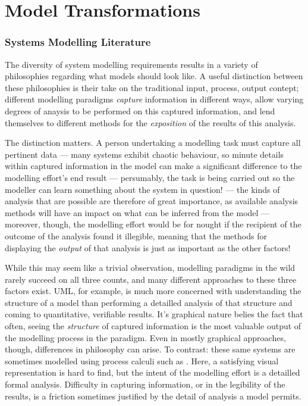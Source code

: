 \documentclass[draft]{article}
\begin{document}




\part{Model Transformations}
\section{Systems Modelling Literature}
\label{sec:literature}
The diversity of system modelling requirements results in a variety of
philosophies regarding what models should look like. A useful distinction
between these philosophies is their take on the traditional input, process,
output contept; different modelling paradigms \emph{capture} information in
different ways, allow varying degrees of anaysis to be performed on this
captured information, and lend themselves to different methods for the
\emph{exposition} of the results of this analysis.\par

The distinction matters. A person undertaking a modelling task must capture all
pertinent data --- many systems exhibit chaotic behaviour, so minute details
within captured information in the model can make a significant difference to
the modelling effort's end result --- persumably, the task is being carried out
so the modeller can learn something about the system in question! --- the kinds
of analysis that are possible are therefore of great importance, as available
analysis methods will have an impact on what can be inferred from the model ---
moreover, though, the modelling effort would be for nought if the recipient of
the outcome of the analysis found it illegible, meaning that the methods for
displaying the \emph{output} of that analysis is just as important as the other
factors!\par

While this may seem like a trivial observation, modelling paradigms in the wild
rarely succeed on all three counts, and many different approaches to these three
factors exist. UML, for example, is much more concerned with understanding the
structure of a model than performing a detailled analysis of that structure and
coming to quantitative, verifiable results. It's graphical nature belies the
fact that often, seeing the \emph{structure} of captured information is the most
valuable output of the modelling process in the paradigm. Even in mostly
graphical approaches, though, differences in philosophy can arise. To contrast:
these same systems are sometimes modelled using process calculi such as
\picalculus. Here, a satisfying visual representation is hard to find, but the
intent of the modelling effort is a detailled formal analysis. Difficulty in
capturing information, or in the legibility of the results, is a friction
sometimes justified by the detail of analysis a model permits. \par
\end{document}
